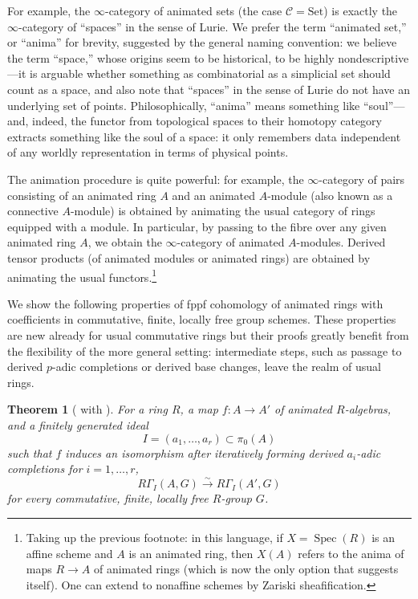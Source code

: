 \documentclass[11pt, reqno]{amsart}
\newcommand{\sC}{\mathscr{C}}
\DeclareMathOperator{\Spec}{Spec}		%
\newcommand{\isomto}{\overset{\sim}{\longrightarrow}}
\newcommand{\ra}{\rightarrow}
\providecommand{\Set}{\mathrm{Set}}
\providecommand{\up}[1]{{\upshape(}#1{\upshape)}}
\providecommand{\uref}[1]{{\upshape\ref{#1}}}
\newcommand{\bthm}{\begin{thm}}
\newcommand{\ethm}{\end{thm}}
\numberwithin{equation}{numberingbase}
\theoremstyle{thms}
\newtheorem{thm}[numberingbase]{Theorem}
\theoremstyle{claims}
\theoremstyle{defs}
\theoremstyle{thms}
\theoremstyle{defs}
\theoremstyle{subsection-tweak}
\theoremstyle{subsection-tweak}
\begin{document}
For example, the $\infty$-category of animated sets (the case $\sC = \Set$) is exactly the $\infty$-category of ``spaces'' in the sense of Lurie. We prefer the term ``animated set,'' or ``anima'' for brevity, suggested by the general naming convention: we believe the term ``space,''  whose origins seem to be historical, to be highly nondescriptive---it is arguable whether something as combinatorial as a simplicial set should count as a space, and also note that ``spaces'' in the sense of Lurie do not have an underlying set of points. %
Philosophically, ``anima''  means something like ``soul''---and, indeed, the functor from topological spaces to their homotopy category extracts something like the soul of a space: it only remembers data independent of any worldly representation in terms of physical points.%

The animation procedure is quite powerful: for example, the $\infty$-category of pairs consisting of an animated ring $A$ and an animated $A$-module (also known as a connective $A$-module) is obtained by animating the usual category of rings equipped with a module. In particular, by passing to the fibre over any given animated ring $A$, we obtain the $\infty$-category of animated $A$-modules. Derived tensor products (of animated modules or animated rings) are obtained by animating the usual functors.\footnote{Taking up the previous footnote: in this language, if $X=\Spec(R)$ is an affine scheme and $A$ is an animated ring, then $X(A)$ refers to the anima of maps $R\to A$ of animated rings (which is now the only option that suggests itself). One can extend to nonaffine schemes by Zariski sheafification.}

We show the following properties of fppf cohomology of animated rings with coefficients in commutative, finite, locally free group schemes. These properties are new already for usual commutative rings but their proofs greatly benefit from the flexibility of the more general setting: intermediate steps, such as passage to derived $p$-adic completions or derived base changes, leave the realm of usual rings. %

\bthm[ with ] \label{thm:excision-ann}
For a ring $R$, a map $f\colon A \ra A'$ of animated $R$-algebras, and a finitely generated ideal 
\[
I = (a_1, \dotsc, a_r) \subset \pi_0(A)
\] %
such that $f$ induces an isomorphism after iteratively forming derived $a_i$-adic completions for $i = 1, \dotsc, r$, %
\[
R\Gamma_I(A, G) \isomto R\Gamma_I(A', G)
\]
for every commutative, finite, locally free $R$-group $G$.
\ethm
\end{document}
